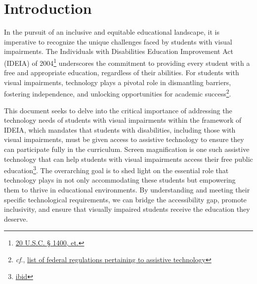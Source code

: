 \documentclass[14pt,letterpaper,twoside]{extreport}
\title{\Huge ENHANCING EDUCATIONAL EQUITY: \vskip2em \Large A Comprehensive Exploration of Technology Needs for Students with Visual Impairments}
\author{Michael Ryan Hunsaker, M.Ed., Ph.D.}
\date{\vfill \textit{Last Updated: {\today}}}
\begin{document}
\maketitle
{}
\dominitoc
\setcounter{minitocdepth}{1}
\setcounter{tocdepth}{1}
\cleardoublepage
\fancyhead{}
\fancyfoot{}
\tableofcontents
{}
\listoffigures
{}
\listoftables
\newpage{}
\fancyhead{}
\fancyfoot{}

\hypertarget{intro}{}\chapter*{Introduction}\label{intro}

\pagestyle{fancyplain}
\fancyfoot[C]{\thepage}
In the pursuit of an inclusive and equitable educational landscape, it is imperative to recognize the unique challenges faced by students with visual impairments. The Individuals with Disabilities Education Improvement Act (IDEIA) of 2004\footnote{\href{https://sites.ed.gov/idea/statuteregulations/}{20 U.S.C. § 1400, et.}} underscores the commitment to providing every student with a free and appropriate education, regardless of their abilities. For students with visual impairments, technology plays a pivotal role in dismantling barriers, fostering independence, and unlocking opportunities for academic success\footnote{\textit{cf}., \href{https://ectacenter.org/topics/atech/laws.asp}{list of federal regulations pertaining to assistive technology}}.

This document seeks to delve into the critical importance of addressing the technology needs of students with visual impairments within the framework of IDEIA, which mandates that students with disabilities, including those with visual impairments, must be given access to assistive technology to ensure they can participate fully in the curriculum. Screen magnification is one such assistive technology that can help students with visual impairments access their free public education\footnote{\href{https://sites.ed.gov/idea/statuteregulations/}{ibid}}. The overarching goal is to shed light on the essential role that technology plays in not only accommodating these students but empowering them to thrive in educational environments. By understanding and meeting their specific technological requirements, we can bridge the accessibility gap, promote inclusivity, and ensure that visually impaired students receive the education they deserve.
\end{document}
